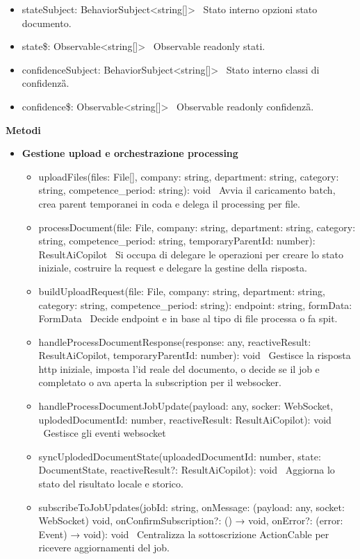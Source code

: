 \documentclass[a4paper,11pt]{article}
\begin{document}
\begin{itemize}[noitemsep, topsep=0pt]
\begin{itemize}[noitemsep, topsep=0pt]
\item stateSubject: BehaviorSubject<string[]> \ Stato interno opzioni stato documento.
\item state\$: Observable<string[]> \ Observable readonly stati.
\item confidenceSubject: BehaviorSubject<string[]> \ Stato interno classi di confidenza\G{}.
\item confidence\$: Observable<string[]> \ Observable readonly confidenza\G{}.
\end{itemize}
\end{itemize}

\textbf{Metodi}
\begin{itemize}[noitemsep, topsep=0pt]
\item \textbf{Gestione upload e orchestrazione processing}
\begin{itemize}[noitemsep, topsep=0pt]
\item uploadFiles(files: File[], company: string, department: string, category: string, competence_period: string): void \
Avvia il caricamento batch, crea parent temporanei in coda e delega il processing per file.
\item processDocument(file: File, company: string, department: string, category: string, competence_period: string, temporaryParentId: number): ResultAiCopilot \
Si occupa di delegare le operazioni per creare lo stato iniziale, costruire la request e delegare la gestine della risposta.
\item buildUploadRequest(file: File, company: string, department: string, category: string, competence_period: string): {endpoint: string, formData: FormData} \ Decide endpoint e in base al tipo di file processa o fa spit.
\item handleProcessDocumentResponse(response: any, reactiveResult: ResultAiCopilot, temporaryParentId: number): void \ Gestisce la risposta http iniziale, imposta l'id reale del documento, o decide se il job e completato o ava aperta la subscription per il websocker.
\item handleProcessDocumentJobUpdate(payload: any, socker: WebSocket, uplodedDocumentId: number, reactiveResult: ResultAiCopilot): void \ Gestisce gli eventi websocket 
\item syncUplodedDocumentState(uploadedDocumentId: number, state: DocumentState, reactiveResult?: ResultAiCopilot): void \ Aggiorna lo stato del risultato locale e storico.
\item subscribeToJobUpdates(jobId: string, onMessage: (payload: any, socket: WebSocket) 
void, onConfirmSubscription?: () → void, 
onError?: (error: Event) → void): void \
Centralizza la sottoscrizione ActionCable per ricevere aggiornamenti del job.
\end{itemize}


\end{itemize}
\end{document}
